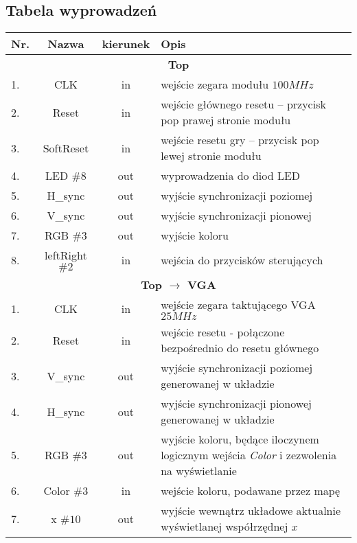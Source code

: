\subsection{Tabela wyprowadzeń}
    \begin{table}[!ht]
        \begin{tabularx}{\textwidth}{|l|c|c|X|}\hline
            Nr. & Nazwa & kierunek & Opis\\\hline
            \hline
            \multicolumn{4}{|c|}{\textbf{Top}}\\\hline
            1. & CLK                & in & wejście zegara modułu $100MHz$\\\hline
            2. & Reset              & in & wejście głównego resetu -- przycisk pop prawej stronie modułu\\\hline
            3. & SoftReset          & in & wejście resetu gry  -- przycisk pop lewej  stronie modułu\\\hline
            4. & LED $\#8$          & out & wyprowadzenia do diod LED\\\hline
            5. & H\_sync            & out & wyjście synchronizacji poziomej\\\hline
            6. & V\_sync            & out & wyjście synchronizacji pionowej\\\hline
            7. & RGB $\#3$          & out & wyjście koloru\\\hline
            8. & leftRight $\#2$    & in & wejścia do przycisków sterujących\\\hline
            \hline
            \multicolumn{4}{|c|}{\textbf{Top $\rightarrow$ VGA}}\\\hline
            1. & CLK    & in  & wejście zegara taktującego VGA $25MHz$\\\hline
            2. & Reset  & in  & wejście resetu - połączone bezpośrednio do resetu głównego\\\hline
            3. & V\_sync& out & wyjście synchronizacji poziomej generowanej w układzie \\\hline
            4. & H\_sync& out & wyjście synchronizacji pionowej generowanej w układzie \\\hline
            5. & RGB   $\#3$& out & wyjście koloru, będące iloczynem logicznym wejścia \textit{Color} i zezwolenia na wyświetlanie\\\hline
            6. & Color $\#3$& in  & wejście koloru, podawane przez mapę\\\hline
            7. & x $\#10$& out & wyjście wewnątrz układowe aktualnie wyświetlanej współrzędnej $x$ \\\hline

\end{tabularx}
\end{table}
